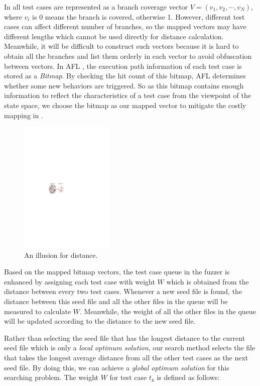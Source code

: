 In \cite{wang2015similarity} all test cases are represented as a branch coverage vector $\mathit{V}=(v_1, v_2, \cdots, v_N)$, where $v_i$ is 0 means the branch is covered, otherwise 1. 
However, different test cases can affect different number of branches, so the mapped vectors may have different lengths which cannot be used directly for distance calculation. Meanwhile, it will be difficult to construct such vectors because it is hard to obtain all the branches and list them orderly in each vector to avoid obfuscation between vectors. 
In AFL \cite{online:afl}, the execution path information of each test case is stored as a \emph{Bitmap}. By checking the hit count of this bitmap, AFL determines whether some new behaviors are triggered. So as this bitmap contains enough information to reflect the characteristics of a test case from the viewpoint of the state space, we choose the bitmap as our mapped vector to mitigate the costly mapping in \cite{wang2015similarity}.

\begin{figure}
\centering
\includegraphics[width=0.4\textwidth]{figures/distance-illusion.pdf} 
\caption{An illusion for distance.}\label{distance-illusion}
\end{figure}

Based on the mapped bitmap vectors, the test case queue in the fuzzer is enhanced by assigning each test case with weight $W$ which is obtained from the distance between every two test cases. Whenever a new seed file is found, the distance between this seed file and all the other files in the queue will be measured to calculate $W$. Meanwhile, the weight of all the other files in the queue will be updated according to the distance to the new seed file. 

Rather than selecting the seed file that has the longest distance to the current seed file which is only a \emph{local optimum solution}, our search method selects the file that takes the longest average distance from all the other test cases as the next seed file. By doing this, we can achieve a \emph{global optimum solution} for this searching problem. The weight $W$ for test case $t_k$ is defined as follows:


